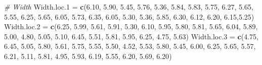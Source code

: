 \documentclass[
]{book}
\newenvironment{Shaded}{\begin{snugshade}}{\end{snugshade}}
\newcommand{\CommentTok}[1]{\textcolor[rgb]{0.56,0.35,0.01}{\textit{#1}}}
\newcommand{\FloatTok}[1]{\textcolor[rgb]{0.00,0.00,0.81}{#1}}
\newcommand{\FunctionTok}[1]{\textcolor[rgb]{0.13,0.29,0.53}{\textbf{#1}}}
\newcommand{\NormalTok}[1]{#1}
\newcommand{\OtherTok}[1]{\textcolor[rgb]{0.56,0.35,0.01}{#1}}
\begin{document}
\begin{Shaded}
\begin{Highlighting}[]
\CommentTok{\# Width}
\NormalTok{Width.loc}\FloatTok{.1} \OtherTok{=} \FunctionTok{c}\NormalTok{(}\FloatTok{6.10}\NormalTok{, }\FloatTok{5.90}\NormalTok{, }\FloatTok{5.45}\NormalTok{, }\FloatTok{5.76}\NormalTok{, }\FloatTok{5.36}\NormalTok{, }\FloatTok{5.84}\NormalTok{, }\FloatTok{5.83}\NormalTok{, }\FloatTok{5.75}\NormalTok{, }\FloatTok{6.27}\NormalTok{, }\FloatTok{5.65}\NormalTok{, }\FloatTok{5.55}\NormalTok{, }
                \FloatTok{6.25}\NormalTok{, }\FloatTok{5.65}\NormalTok{, }\FloatTok{6.05}\NormalTok{, }\FloatTok{5.73}\NormalTok{, }\FloatTok{6.35}\NormalTok{, }\FloatTok{6.05}\NormalTok{, }\FloatTok{5.30}\NormalTok{, }\FloatTok{5.36}\NormalTok{, }\FloatTok{5.85}\NormalTok{, }\FloatTok{6.30}\NormalTok{, }\FloatTok{6.12}\NormalTok{, }
                \FloatTok{6.20}\NormalTok{, }\FloatTok{6.15}\NormalTok{,}\FloatTok{5.25}\NormalTok{)}
\NormalTok{Width.loc}\FloatTok{.2} \OtherTok{=} \FunctionTok{c}\NormalTok{(}\FloatTok{6.25}\NormalTok{, }\FloatTok{5.99}\NormalTok{, }\FloatTok{5.61}\NormalTok{, }\FloatTok{5.91}\NormalTok{, }\FloatTok{5.30}\NormalTok{, }\FloatTok{6.10}\NormalTok{, }\FloatTok{5.95}\NormalTok{, }\FloatTok{5.80}\NormalTok{, }\FloatTok{5.81}\NormalTok{, }\FloatTok{5.65}\NormalTok{, }\FloatTok{6.04}\NormalTok{, }
                \FloatTok{5.89}\NormalTok{, }\FloatTok{5.00}\NormalTok{, }\FloatTok{4.80}\NormalTok{, }\FloatTok{5.05}\NormalTok{, }\FloatTok{5.10}\NormalTok{, }\FloatTok{6.45}\NormalTok{, }\FloatTok{5.51}\NormalTok{, }\FloatTok{5.81}\NormalTok{, }\FloatTok{5.95}\NormalTok{, }\FloatTok{6.25}\NormalTok{, }\FloatTok{4.75}\NormalTok{, }
                \FloatTok{5.63}\NormalTok{)}
\NormalTok{Width.loc}\FloatTok{.3} \OtherTok{=} \FunctionTok{c}\NormalTok{(}\FloatTok{4.75}\NormalTok{, }\FloatTok{6.45}\NormalTok{, }\FloatTok{5.05}\NormalTok{, }\FloatTok{5.80}\NormalTok{, }\FloatTok{5.61}\NormalTok{, }\FloatTok{5.75}\NormalTok{, }\FloatTok{5.55}\NormalTok{, }\FloatTok{5.50}\NormalTok{, }\FloatTok{4.52}\NormalTok{, }\FloatTok{5.53}\NormalTok{, }\FloatTok{5.80}\NormalTok{, }
                \FloatTok{5.45}\NormalTok{, }\FloatTok{6.00}\NormalTok{, }\FloatTok{6.25}\NormalTok{, }\FloatTok{5.65}\NormalTok{, }\FloatTok{5.57}\NormalTok{, }\FloatTok{6.21}\NormalTok{, }\FloatTok{5.11}\NormalTok{, }\FloatTok{5.81}\NormalTok{, }\FloatTok{4.95}\NormalTok{, }\FloatTok{5.93}\NormalTok{, }\FloatTok{6.19}\NormalTok{, }
                \FloatTok{5.55}\NormalTok{, }\FloatTok{6.20}\NormalTok{, }\FloatTok{5.69}\NormalTok{, }\FloatTok{6.20}\NormalTok{)}


\end{Highlighting}
\end{Shaded}
\end{document}
